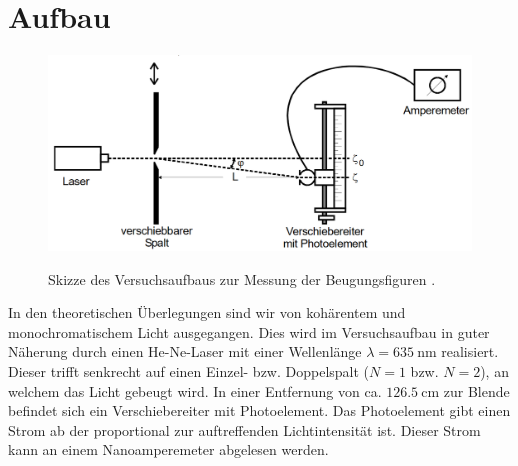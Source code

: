 \section{Aufbau}
\label{sec:Aufbau}
\begin{figure}
	\centering
	\caption{Skizze des Versuchsaufbaus zur Messung der Beugungsfiguren \cite{V406}.}
	\includegraphics[width=\linewidth-150pt,height=\textheight-150pt,keepaspectratio]{content/images/Aufbau.png}
	\label{fig:Aufbau}
\end{figure}
In den theoretischen Überlegungen sind wir von kohärentem und monochromatischem Licht ausgegangen. Dies wird im Versuchsaufbau in guter Näherung durch einen He-Ne-Laser mit einer Wellenlänge $\lambda = \SI{635}{\nano\meter}$ realisiert. Dieser trifft senkrecht auf einen Einzel- bzw. Doppelspalt ($N=1$ bzw. $N=2$), an welchem das Licht gebeugt wird. In einer Entfernung von ca. $\SI{126.5}{\centi\meter}$ zur Blende befindet sich ein Verschiebereiter mit Photoelement. Das Photoelement gibt einen Strom ab der proportional zur auftreffenden Lichtintensität ist. Dieser Strom kann an einem Nanoamperemeter abgelesen werden.
